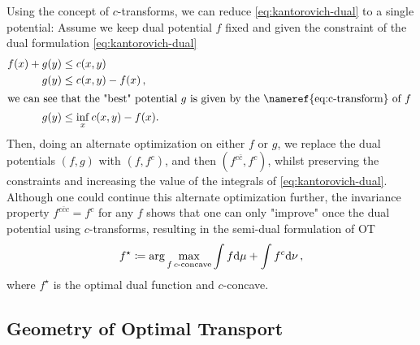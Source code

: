 Using the concept of $c$-transforms, we can reduce \eqref{eq:kantorovich-dual} to a single potential: Assume we keep dual potential $f$ fixed and given the constraint of the dual formulation \eqref{eq:kantorovich-dual}
\begin{align*}
  f(x)+g(y) & \leq c(x, y) \\
  g(y) & \leq c(x, y)-f(x)\,, \\
  \intertext{we can see that the "best" potential $g$ is given by the \nameref{eq:c-transform} of $f$ }
  \label{eq:best_g} g(y) & \leq \inf _x c(x, y) - f(x).
\end{align*} 
Then, doing an alternate optimization on either $f$ or $g$, we replace the dual potentials $(f, g)$ with $(f, f^c)$, and then $(f^{c\bar{c}}, f^c)$, whilst preserving the constraints and increasing the value of the integrals of \eqref{eq:kantorovich-dual}.  
Although one could continue this alternate optimization further, the invariance property $f^{c\bar{c}c} = f^c$ for any $f$ shows that one can only "improve" once the dual potential using $c$-transforms, resulting in the semi-dual formulation of \acrlong{OT}
\begin{equation} \label{eq:semi-dual}
  f^\star \coloneqq \arg\max_{f\, c\text{-concave}} \int f \textrm{d}\mu + \int f^c\textrm{d}\nu\,,
\end{equation}
where $f^\star$ is the optimal dual function and $c$-concave.
\subsection{Geometry of Optimal Transport}
\label{sec:background_brenier}

